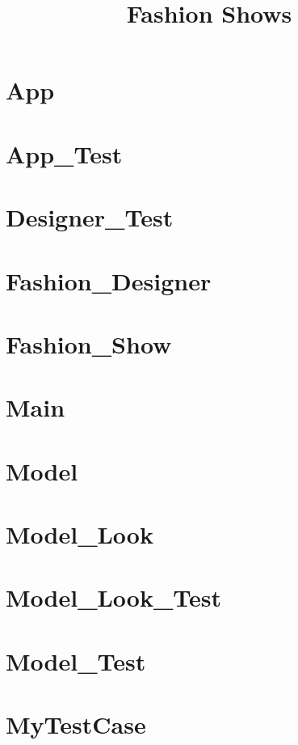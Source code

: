\documentclass{article}
\begin{document}
\title{Fashion Shows}
\author{}
\maketitle
\tableofcontents

\section{App}

\section{App\_Test}

\section{Designer\_Test}

\section{Fashion\_Designer}

\section{Fashion\_Show}

\section{Main}

\section{Model}

\section{Model\_Look}

\section{Model\_Look\_Test}

\section{Model\_Test}

\section{MyTestCase}

\end{document}
